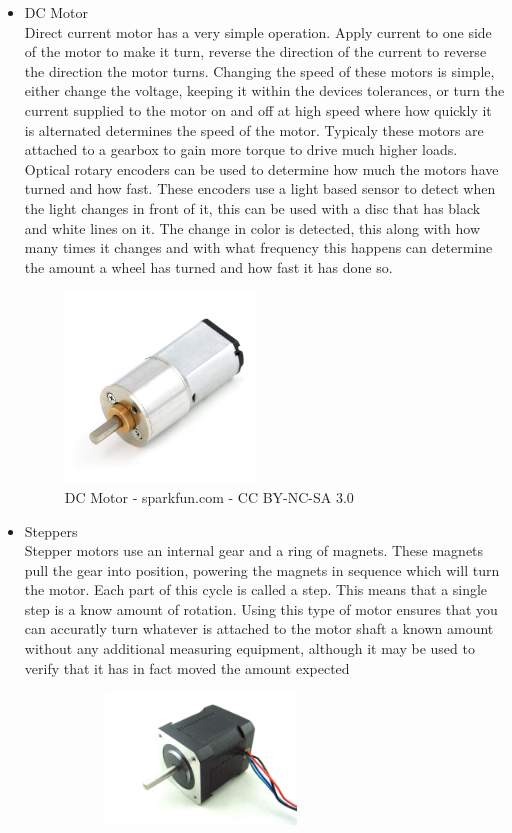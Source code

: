 \begin{itemize}
\item DC Motor
\\Direct current motor has a very simple operation.  Apply current to one side of the motor to make it turn, reverse the direction of the current to reverse the direction the motor turns.  Changing the speed of these motors is simple, either change the voltage, keeping it within the devices tolerances, or turn the current supplied to the motor on and off at high speed where how quickly it is alternated determines the speed of the motor.  Typicaly these motors are attached to a gearbox to gain more torque to drive much higher loads.  Optical rotary encoders can be used to determine how much the motors have turned and how fast.  These encoders use a light based sensor to detect when the light changes in front of it, this can be used with a disc that has black and white lines on it.  The change in color is detected, this along with how many times it changes and with what frequency this happens can determine the amount a wheel has turned and how fast it has done so.
\begin{figure}[h]
\centering
        \includegraphics[width=2.0in] {Images/dc-motor.jpg}
        \caption{DC Motor - sparkfun.com - CC BY-NC-SA 3.0}
        \label{DC Motor}
\end{figure}
\item Steppers
\\Stepper motors use an internal gear and a ring of magnets.  These magnets pull the gear into position, powering the magnets in sequence which will turn the motor.  Each part of this cycle is called a step.  This means that a single step is a know amount of rotation.  Using this type of motor ensures that you can accuratly turn whatever is attached to the motor shaft a known amount without any additional measuring equipment, although it may be used to verify that it has in fact moved the amount expected
\begin{figure}[h]
\centering
\begin{subfigure}
	\centering
        \includegraphics[width=2.0in] {Images/stepper.jpg}

\end{subfigure}
\end{figure}
\end{itemize}
